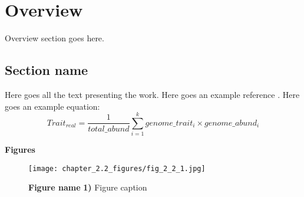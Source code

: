 
\sloppy

\section{Overview}

Overview section goes here.

\newpage


\begin{refsection} %

\section{Section name}
\label{section:2.2} %

Here goes all the text presenting the work.
Here goes an example reference \parencite{Fierer2014,Sunagawa2015}.
Here goes an example equation: \\

\begin{equation}
Trait_{real} = \frac{1}{total\_abund} \sum_{i=1}^{k} genome\_trait_i \times genome\_abund_i
\label{eq:2.3-6}
\end{equation}
\vspace{0.5cm}

\clearpage
\pagestyle{plain}
\printbibliography
\end{refsection}
\clearpage
\pagestyle{fancy}


\newpage

\textbf{Figures}

\begin{figure}[h]
\centering
\texttt{[image: chapter\_2.2\_figures/fig\_2\_2\_1.jpg]}
\caption{\textbf{Figure name} \textbf{1)} Figure caption}
\label{fig:2.2-1}
\end{figure}


